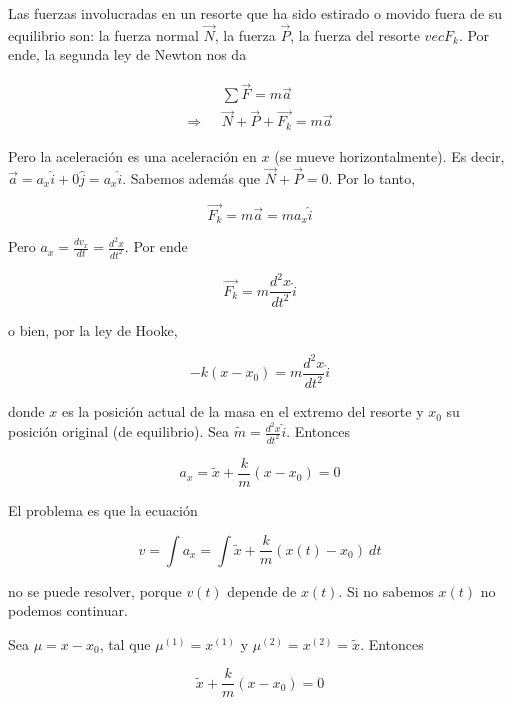 \documentclass[12pt]{article}
\theoremstyle{definition}
\begin{document}
Las fuerzas involucradas en un resorte que ha sido estirado o movido fuera de su
equilibrio son: la fuerza normal $\vec{N}$, la fuerza $\vec{P}$, la fuerza del
resorte $vec{F}_k$. Por ende, la segunda ley de Newton nos da 

\begin{align*}
    &\sum \vec{F} = m \vec{a}\\ 
    \Rightarrow ~ ~ ~ & \vec{N} + \vec{P} + \vec{F_k} = m \vec{a}
\end{align*}

Pero la aceleración es una aceleración en $x$ (se mueve horizontalmente). Es
decir, $\vec{a} = a_x \hat{i} + 0 \hat{j} = a_x \hat{i}$. Sabemos además que
$\vec{N} + \vec{P} = 0$. Por lo tanto, 

\begin{equation*}
    \vec{F_k} = m\vec{a} = ma_x \hat{i} 
\end{equation*}

Pero $a_x = \frac{dv_x}{dt} = \frac{d^2 x}{dt^2}$. Por ende

\begin{equation*}
    \vec{F_k} = m \frac{d^2 x}{dt^2} \hat{i}
\end{equation*}

o bien, por la ley de Hooke, 

\begin{equation*}
    -k(x - x_0) = m \frac{d^2 x}{dt^2} \hat{i}
\end{equation*}

donde $x$ es la posición actual de la masa en el extremo del resorte y $x_0$ su
posición original (de equilibrio). Sea $\widetilde{ m } = \frac{d^2 x}{dt^2}
\hat{i}$.
Entonces

\begin{equation*}
    a_x = \widetilde{ x }  + \frac{k}{m}(x - x_0) = 0
\end{equation*}

El problema es que la ecuación 

\begin{equation*}
    v = \int a_x = \int \widetilde{ x } + \frac{k}{m}(x(t) - x_0) ~ dt
\end{equation*}

no se puede resolver, porque $v(t)$ depende de $x(t)$. Si no sabemos $x(t)$ no
podemos continuar.

Sea $\mu = x - x_0$, tal que $\mu^{(1)} = x^{(1)}$ y $\mu^{(2)} = x^{(2)} =
\widetilde{ x } $. Entonces 

\begin{equation*}
    \widetilde{ x }  + \frac{k}{m}(x - x_0) = 0
\end{equation*}
\end{document}
